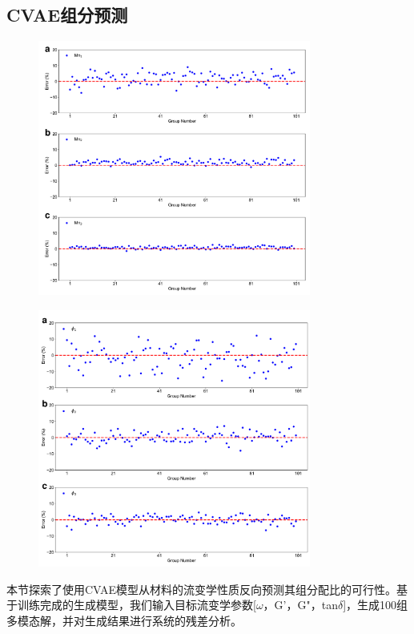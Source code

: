 \subsection{CVAE组分预测}
\begin{figure}[htbp]
  \centering
  \includegraphics[width=0.8\textwidth]{Fig/reverse-redisual-Mn.pdf}
\end{figure}

\begin{figure}[htbp]
  \centering
  \includegraphics[width=0.8\textwidth]{Fig/reverse-redisual-phi.pdf}
\end{figure}
本节探索了使用CVAE模型从材料的流变学性质反向预测其组分配比的可行性。基于训练完成的生成模型，我们输入目标流变学参数[$\omega$，G'，G"，tan$\delta$]，生成100组多模态解，并对生成结果进行系统的残差分析。

